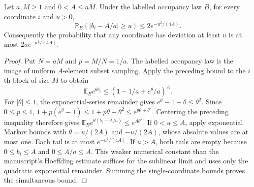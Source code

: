 \begin{lemma}
\label{lem:occupancy-concentration}
\leanok
Let $a,M\geq1$ and $0<A\leq aM$. Under the labelled occupancy
law $B$, for every coordinate $i$ and $u>0$,
\[
 \mathbb P_B(|b_i-A/a|\geq u)\leq2e^{-u^2/(4A)}.
\]
Consequently the probability that any coordinate has deviation at least $u$
is at most $2a e^{-u^2/(4A)}$.
\end{lemma}
\begin{proof}
Put $N=aM$ and $p=M/N=1/a$. The labelled occupancy law is the
image of uniform $A$-element subset sampling. Apply the preceding
bound to the $i$th block of size $M$ to obtain
\[
 \mathbb E_B e^{\theta b_i}\leq(1-1/a+e^\theta/a)^A.
\]
For $|\theta|\leq1$, the exponential-series remainder gives
$e^\theta-1-\theta\leq\theta^2$. Since $0\leq p\leq1$,
$1+p(e^\theta-1)\leq1+p\theta+\theta^2\leq e^{p\theta+\theta^2}$.
Centering the preceding inequality therefore gives
$\mathbb E_Be^{\theta(b_i-A/a)}\leq e^{A\theta^2}$.
If $0<u\leq A$, apply exponential Markov bounds with
$\theta=u/(2A)$ and $-u/(2A)$, whose absolute values are at most one.
Each tail is at most $e^{-u^2/(4A)}$. If $u>A$, both tails are empty
because $0\leq b_i\leq A$ and $0\leq A/a\leq A$.
This weaker numerical constant than the manuscript's Hoeffding estimate
suffices for the sublinear limit and uses only the quadratic exponential
remainder.
Summing the single-coordinate bounds proves the simultaneous bound.

\end{proof}

